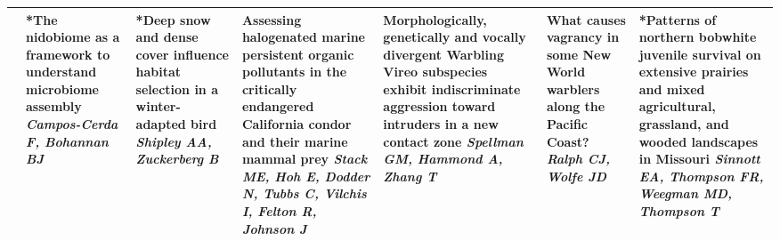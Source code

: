 \begin{tabular}{|x{0.75cm}|a{2.25cm}|x{2.25cm}|x{2.25cm}|x{2.25cm}|x{2.25cm}|x{2.25cm}|}
\hline
{}&*The nidobiome as a framework to understand microbiome assembly \newline \newline \textit{Campos-Cerda F, Bohannan BJ} & *Deep snow and dense cover influence habitat selection in a winter-adapted bird \newline \newline \textit{Shipley AA, Zuckerberg B} & Assessing halogenated marine persistent organic pollutants in the critically endangered California condor and their marine mammal prey \newline \newline \textit{Stack ME, Hoh E, Dodder N, Tubbs C, Vilchis I, Felton R, Johnson J} & Morphologically, genetically and vocally divergent Warbling Vireo subspecies exhibit indiscriminate aggression toward intruders in a new contact zone \newline \newline \textit{Spellman GM, Hammond A, Zhang T} & What causes vagrancy in some New World  warblers along the Pacific Coast? \newline \newline \textit{Ralph CJ, Wolfe JD} & *Patterns of northern bobwhite juvenile survival on extensive prairies and mixed agricultural, grassland, and wooded landscapes in Missouri \newline \newline \textit{Sinnott EA, Thompson FR, Weegman MD, Thompson T}\\
\hline

\end{tabular}
